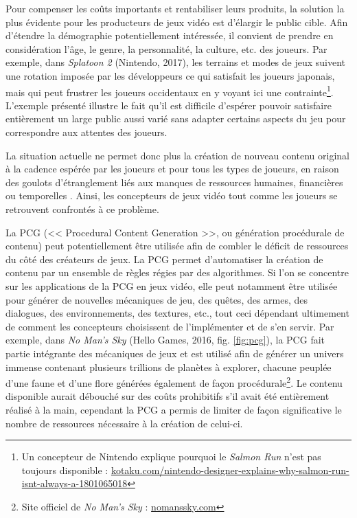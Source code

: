 \documentclass[a4paper,11pt]{article}
\begin{document}
      Pour compenser les coûts importants et rentabiliser leurs produits, la solution la plus évidente pour les producteurs de jeux vidéo est d'élargir le public cible.
      Afin d'étendre la démographie potentiellement intéressée, il convient de prendre en considération l'âge, le genre, la personnalité, la culture, etc. des joueurs.
      Par exemple, dans \textit{Splatoon 2} (Nintendo, 2017), les terrains et modes de jeux suivent une rotation imposée par les développeurs ce qui satisfait les joueurs japonais, mais qui peut frustrer les joueurs occidentaux en y voyant ici une contrainte\footnote{Un concepteur de Nintendo explique pourquoi le \textit{Salmon Run} n'est pas toujours disponible : \url{kotaku.com/nintendo-designer-explains-why-salmon-run-isnt-always-a-1801065018}}. 
      L'exemple présenté illustre le fait qu'il est difficile d'espérer pouvoir satisfaire entièrement un large public aussi varié sans adapter certains aspects du jeu pour correspondre aux attentes des joueurs.
          
      La situation actuelle ne permet donc plus la création de nouveau contenu original à la cadence espérée par les joueurs et pour tous les types de joueurs, en raison des goulots d'étranglement liés aux manques de ressources humaines, financières ou temporelles \cite{Hendrikx}.
      Ainsi, les concepteurs de jeux vidéo tout comme les joueurs se retrouvent confrontés à ce problème.
      
      La PCG (<< Procedural Content Generation >>, ou génération procédurale de contenu) peut potentiellement être utilisée afin de combler le déficit de ressources du côté des créateurs de jeux.
      La PCG permet d'automatiser la création de contenu par un ensemble de règles régies par des algorithmes. 
      Si l'on se concentre sur les applications de la PCG en jeux vidéo, elle peut notamment être utilisée pour générer de nouvelles mécaniques de jeu, des quêtes, des armes, des dialogues, des environnements, des textures, etc., tout ceci dépendant ultimement de comment les concepteurs choisissent de l'implémenter et de s'en servir.
      Par exemple, dans \textit{No Man's Sky} (Hello Games, 2016, fig. \ref{fig:pcg}), la PCG fait partie intégrante des mécaniques de jeux et est utilisé afin de générer un univers immense contenant plusieurs trillions de planètes à explorer, chacune peuplée d'une faune et d'une flore générées également de façon procédurale\footnote{Site officiel de \textit{No Man's Sky} : \url{nomanssky.com}}. 
      Le contenu disponible aurait débouché sur des coûts prohibitifs s'il avait été entièrement réalisé à la main, cependant la PCG a permis de limiter de façon significative le nombre de ressources nécessaire à la création de celui-ci.
\end{document}
